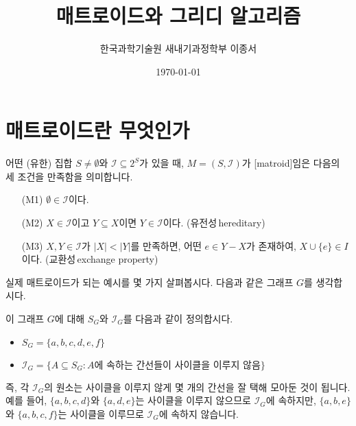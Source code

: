 \documentclass[11pt, a4paper]{book}
\title{매트로이드와 그리디 알고리즘}
\author{한국과학기술원 새내기과정학부 이종서}
\date{\today}
\newcommand{\I}{\mathcal{I}}
\begin{document}
    \maketitle
    \section{매트로이드란 무엇인가}
    \begin{MLDef}
        어떤 (유한) 집합 $S \neq \emptyset$와 $\I \subseteq 2^S$가 있을 때, $M = (S, \I)$가 [matroid]임은 다음의 세 조건을 만족함을 의미합니다.
        \begin{enumerate}
            \item[(M1)] $\emptyset \in \I$이다.
            \item[(M2)] $X \in \I$이고 $Y \subseteq X$이면 $Y \in \I$이다. (유전성\,{\small hereditary})
            \item[(M3)] $X, Y \in \I$가 $|X| < |Y|$를 만족하면, 어떤 $e \in Y - X$가 존재하여, $X \cup \{ e \} \in I$이다. (교환성\,{\small exchange property})
        \end{enumerate}
    \end{MLDef}
    
    실제 매트로이드가 되는 예시를 몇 가지 살펴봅시다. 다음과 같은 그래프 $G$를 생각합시다.
    \begin{center}
    \end{center}
    
    이 그래프 $G$에 대해 $S_G$와 $\I_G$를 다음과 같이 정의합시다.
    \begin{itemize}
        \item $S_G  = \{a, b, c, d, e, f \}$
        \item $\I_G = \{A \subseteq S_G : A\text{에 속하는 간선들이 사이클을 이루지 않음}\}$
    \end{itemize}
    즉, 각 $\I_G$의 원소는 사이클을 이루지 않게 몇 개의 간선을 잘 택해 모아둔 것이 됩니다. 예를 들어, $\{a, b, c, d\}$와 $\{a, d, e\}$는 사이클을 이루지 않으므로 $\I_G$에 속하지만, $\{a, b, e\}$와 $\{a, b, c, f\}$는 사이클을 이루므로 $\I_G$에 속하지 않습니다.
    
\end{document}
